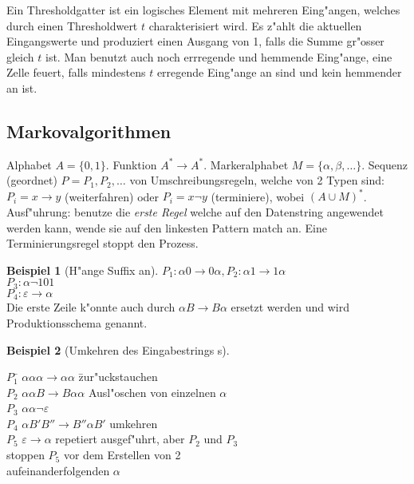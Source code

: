 \documentclass[german, 10pt, a4paper, twocolumn]{scrartcl}
\theoremstyle{definition}
\theoremstyle{example}
\newtheorem{example}{Beispiel}[subsection]
\begin{document}
Ein Thresholdgatter ist ein logisches Element mit mehreren Eing"angen, welches durch einen Thresholdwert $t$ charakterisiert wird. Es z"ahlt die aktuellen Eingangswerte und produziert einen Ausgang von 1, falls die Summe gr"osser gleich $t$ ist. Man benutzt auch noch errregende und hemmende Eing"ange, eine Zelle feuert, falls mindestens $t$ erregende Eing"ange an sind und kein hemmender an ist.


\subsection{Markovalgorithmen}

Alphabet $A=\{ 0,1 \}$. Funktion $A^* \to A^*$. Markeralphabet $M = \{ \alpha, \beta, \ldots \}$. Sequenz (geordnet) $P=P_1,P_2,\ldots$ von Umschreibungsregeln, welche von 2 Typen sind: $P_i = x \to y$ (weiterfahren) oder $P_i = x \neg y$ (terminiere), wobei $(A\cup M)^*$.\\
Ausf"uhrung: benutze die \textit{erste Regel} welche auf den Datenstring angewendet werden kann, wende sie auf den linkesten Pattern match an. Eine Terminierungsregel stoppt den Prozess.

\begin{example}[H"ange Suffix an]
 $P_1: \alpha 0 \to 0 \alpha, P_2: \alpha 1 \to 1 \alpha$\\
 $P_3: \alpha \neg 101$\\
 $P_4: \varepsilon \to \alpha$\\

 Die erste Zeile k"onnte auch durch $\alpha B \to B \alpha$ ersetzt werden und wird Produktionsschema genannt.
\end{example}

\begin{example}[Umkehren des Eingabestrings s]
\ 
\begin{tabbing}
$P_1$\quad \=	$\alpha \alpha \alpha \to \alpha \alpha$ \qquad \qquad \=	zur"uckstauchen\\
$P_2$\>		$\alpha \alpha B \to B \alpha \alpha$ \>			Ausl"oschen von einzelnen $\alpha$\\
$P_3$\>		$\alpha \alpha \neg \varepsilon$\\
$P_4$\>		$\alpha B' B'' \to B'' \alpha B'$ \>				umkehren\\
$P_5$\>		$\varepsilon \to \alpha$ \>					repetiert ausgef"uhrt, aber $P_2$ und $P_3$\\
\>		\>								stoppen $P_5$ vor dem Erstellen von 2\\
\>		\>								aufeinanderfolgenden $\alpha$
\end{tabbing}

\end{example}
\end{document}

